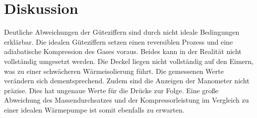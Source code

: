 \section{Diskussion}
\label{sec:Diskussion}

Deutliche Abweichungen der Güteziffern sind durch nicht ideale Bedingungen erklärbar.
Die idealen Güteziffern setzen einen reversiblen Prozess und eine  adiabatische
Kompression des Gases voraus. Beides kann in der Realität nicht vollständig
umgesetzt werden.
Die Deckel liegen nicht vollständig auf den Eimern, was zu einer schwächeren
Wärmeisolierung führt. Die gemessenen Werte verändern sich
dementsprechend. Zudem sind die Anzeigen der Manometer nicht präzise. Dies hat
ungenaue Werte für die Drücke zur Folge. Eine große Abweichung des Massendurchsatzes
und der Kompressorleistung im Vergleich zu einer idealen Wärmepumpe ist somit ebenfalls zu
erwarten.

